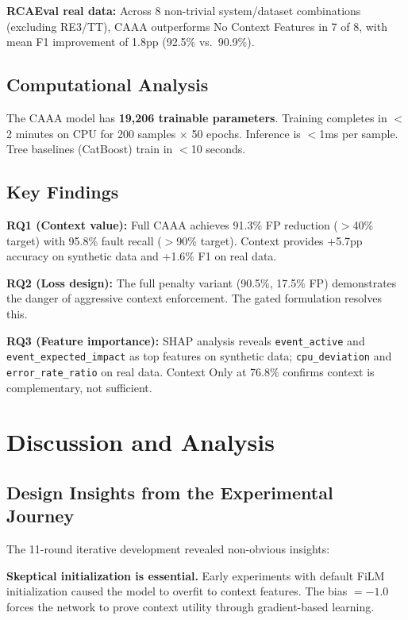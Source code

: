 \documentclass[12pt,a4paper]{report}
\begin{document}
\textbf{RCAEval real data:} Across 8 non-trivial system/dataset combinations (excluding RE3/TT), CAAA outperforms No Context Features in 7 of 8, with mean F1 improvement of 1.8pp (92.5\% vs.\ 90.9\%).

\section{Computational Analysis}

The CAAA model has \textbf{19,206 trainable parameters}. Training completes in $<$2 minutes on CPU for 200 samples $\times$ 50 epochs. Inference is $<$1ms per sample. Tree baselines (CatBoost) train in $<$10 seconds.

\section{Key Findings}

\textbf{RQ1 (Context value):} Full CAAA achieves 91.3\% FP reduction ($>$40\% target) with 95.8\% fault recall ($>$90\% target). Context provides +5.7pp accuracy on synthetic data and +1.6\% F1 on real data.

\textbf{RQ2 (Loss design):} The full penalty variant (90.5\%, 17.5\% FP) demonstrates the danger of aggressive context enforcement. The gated formulation resolves this.

\textbf{RQ3 (Feature importance):} SHAP analysis reveals \texttt{event\_active} and \texttt{event\_expected\_impact} as top features on synthetic data; \texttt{cpu\_deviation} and \texttt{error\_rate\_ratio} on real data. Context Only at 76.8\% confirms context is complementary, not sufficient.


\chapter{Discussion and Analysis}

\section{Design Insights from the Experimental Journey}

The 11-round iterative development revealed non-obvious insights:

\textbf{Skeptical initialization is essential.} Early experiments with default FiLM initialization caused the model to overfit to context features. The bias $= -1.0$ forces the network to prove context utility through gradient-based learning.
\end{document}
